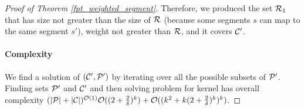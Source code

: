 \begin{proof}[Proof of Theorem \ref{fpt_weighted_segment}]
Therefore, we produced the set $\mathcal{R}_1$ that has size not greater
than the size of $\mathcal{R}$ (because some segments $s$ can map
to the same segment $s'$),
weight not greater than $\mathcal{R}$, and it covers $\mathcal{C}'$.

\paragraph{Complexity}
We find a solution of $(\mathcal{C}',\mathcal{P}')$ by iterating
over all the possible subsets of $\mathcal{P}'$.
Finding sets $\mathcal{P}'$ and $\mathcal{C}'$ and then solving 
problem for kernel has overall complexity
${(|\mathcal{P}| + |\mathcal{C}|)^{\mathcal{O}(1)}
\mathcal{O}((2 + \frac{2}{\delta})^k) + \mathcal{O}((k^2 + k(2 + \frac{2}{\delta})^k)^k)}$.
\end{proof}

